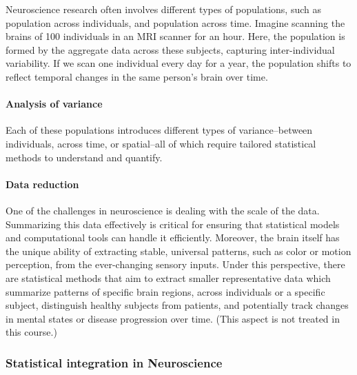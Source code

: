 \documentclass[
]{article}
\begin{document}
Neuroscience research often involves different types of populations,
such as population across individuals, and population across time.
Imagine scanning the brains of 100 individuals in an MRI scanner for an
hour. Here, the population is formed by the aggregate data across these
subjects, capturing inter-individual variability. If we scan one
individual every day for a year, the population shifts to reflect
temporal changes in the same person's brain over time.

\hypertarget{analysis-of-variance}{%
\paragraph{Analysis of variance}\label{analysis-of-variance}}

Each of these populations introduces different types of
variance--between individuals, across time, or spatial--all of which
require tailored statistical methods to understand and quantify.

\hypertarget{data-reduction}{%
\paragraph{Data reduction}\label{data-reduction}}

One of the challenges in neuroscience is dealing with the scale of the
data. Summarizing this data effectively is critical for ensuring that
statistical models and computational tools can handle it efficiently.
Moreover, the brain itself has the unique ability of extracting stable,
universal patterns, such as color or motion perception, from the
ever-changing sensory inputs. Under this perspective, there are
statistical methods that aim to extract smaller representative data
which summarize patterns of specific brain regions, across individuals
or a specific subject, distinguish healthy subjects from patients, and
potentially track changes in mental states or disease progression over
time. (This aspect is not treated in this course.)

\hypertarget{statistical-integration-in-neuroscience}{%
\subsubsection{Statistical integration in
Neuroscience}\label{statistical-integration-in-neuroscience}}
\end{document}
